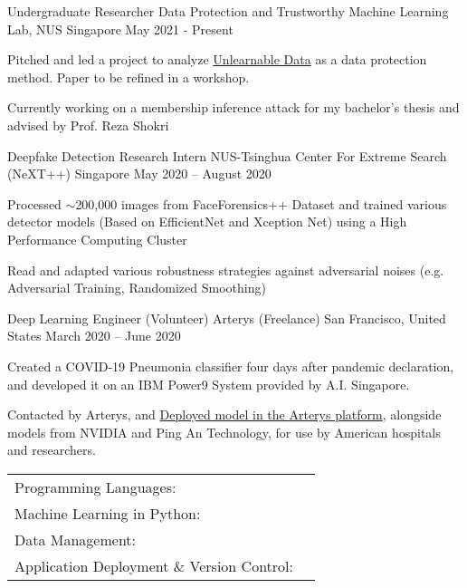\documentclass[]{awesome-cv}
\begin{document}
\begin{cventries}
	\cventry
	{Undergraduate Researcher}
	{Data Protection and Trustworthy Machine Learning Lab, NUS}
	{Singapore}
	{May 2021 - Present}
	{\begin{cvitems}
		\item {Pitched and led a project to analyze \href{https://arxiv.org/abs/2101.04898}{Unlearnable Data} as a data protection method. Paper to be refined in a workshop.}
		\item {Currently working on a membership inference attack for my bachelor's thesis and advised by Prof. Reza Shokri}
		\end{cvitems}}
	\cventry
	{Deepfake Detection Research Intern}
	{NUS-Tsinghua Center For Extreme Search (NeXT++)}
	{Singapore}
	{May 2020 – August 2020}
	{\begin{cvitems}
		\item {Processed $\sim$200,000 images from FaceForensics++ Dataset and trained various detector models (Based on EfficientNet and Xception Net) using a High Performance Computing Cluster}
		\item {Read and adapted various robustness strategies against adversarial noises (e.g. Adversarial Training, Randomized Smoothing)}
		\end{cvitems}}
	\cventry
	{Deep Learning Engineer (Volunteer)}
	{Arterys (Freelance)}
	{San Francisco, United States}
	{March 2020 – June 2020}
	{\begin{cvitems}
		\item {Created a COVID-19 Pneumonia classifier four days after pandemic declaration, and developed it on an IBM Power9 System provided by A.I. Singapore.}
		\item {Contacted by Arterys, and \href{https://marketplace.arterys.com/model/ayrtoncovidXR}{Deployed model in the Arterys platform}, 
		alongside models from NVIDIA and Ping An Technology, for use by American hospitals and researchers.}
		\end{cvitems}}
\end{cventries}

\vspace{-5mm}
\vspace{-3mm}
\begin{cventries}
	\cventry
	{}
	{\def\arraystretch{1.15}{\begin{tabular}{ l l }
		Programming Languages:  & {\skill{ Python, Java, R}} \\
		Machine Learning in Python:  & {\skill{ Pytorch, Pytorch Lightning, NumPy, Sickit-Learn, Fastai}} \\
		Data Management:  & {\skill{ Pandas, SQL, MS Excel}} \\
		Application Deployment \& Version Control:  & {\skill{ Docker, Google Cloud, Git, Singularity}} \\
		\end{tabular}}}
	{}
	{}
	{}
\end{cventries}
\end{document}
